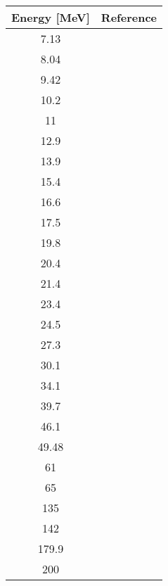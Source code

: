 \begin{tabular}{c  c} 
    \hline 
    \bf{Energy [MeV]} & \bf{Reference} \\
    \hline
    \hline 
    7.13 & \cite{Kobayashi1960}\\
    8.04 & \cite{Kobayashi1960}\\
    9.42 & \cite{Kobayashi1960}\\
    10.2 & \cite{Kobayashi1960}\\
    11 & \cite{Hu1959}\\
    12.9 & \cite{Kobayashi1960}\\
    13.9 & \cite{Kobayashi1960}\\
    15.4 & \cite{Maxson1961}\\
    16.6 & \cite{Maxson1961}\\
    17.5 & \cite{Crawley1968}\\
    19.8 & \cite{Karban1969}\\
    20.4 & \cite{Karban1969}\\
    21.4 & \cite{Karban1969}\\
    23.4 & \cite{Cameron1968}\\
    24.5 & \cite{Cameron1968}\\
    27.3 & \cite{Cameron1968}\\
    30.1 & \cite{Cameron1968}\\
    34.1 & \cite{Cameron1968}\\
    39.7 & \cite{Cameron1968}\\
    46.1 & \cite{Cameron1968}\\
    49.48 & \cite{Fannon1967}\\
    61 & \cite{Bertrand1973}\\
    65 & \cite{Sakaguchi1982}\\
    135 & \cite{Kelly1989}\\
    142 & \cite{Taylor1961}\\
    179.9 & \cite{Kelly1990}\\
    200 & \cite{Glover1985}\\
    \hline
\end{tabular}
